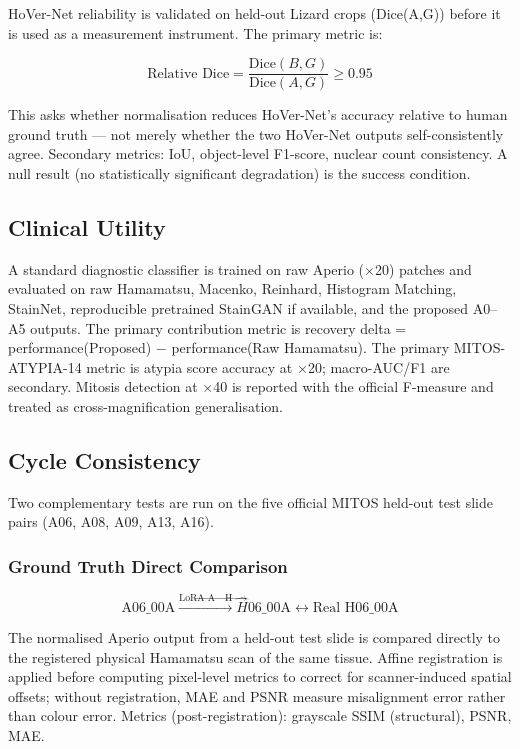 \documentclass[a4paper,twoside,12pt]{report}
\begin{document}
HoVer-Net reliability is validated on held-out Lizard crops (Dice(A,G)) before it is used as a measurement instrument. The primary metric is:

\begin{equation}
\text{Relative Dice} = \frac{\mathrm{Dice}(B, G)}{\mathrm{Dice}(A, G)} \geq 0.95
\end{equation}

This asks whether normalisation reduces HoVer-Net's accuracy relative to human ground truth --- not merely whether the two HoVer-Net outputs self-consistently agree. Secondary metrics: IoU, object-level F1-score, nuclear count consistency. A null result (no statistically significant degradation) is the success condition.

\subsection{Clinical Utility}

A standard diagnostic classifier is trained on raw Aperio ($\times$20) patches and evaluated on raw Hamamatsu, Macenko, Reinhard, Histogram Matching, StainNet, reproducible pretrained StainGAN if available, and the proposed A0--A5 outputs. The primary contribution metric is recovery delta = performance(Proposed) $-$ performance(Raw Hamamatsu). The primary MITOS-ATYPIA-14 metric is atypia score accuracy at $\times$20; macro-AUC/F1 are secondary. Mitosis detection at $\times$40 is reported with the official F-measure and treated as cross-magnification generalisation.

\subsection{Cycle Consistency}

Two complementary tests are run on the five official MITOS held-out test slide pairs (A06, A08, A09, A13, A16).

\subsubsection{Ground Truth Direct Comparison}

\begin{equation}
\text{A06\_00A} \xrightarrow{\text{LoRA A}\rightarrow\text{H}} \hat{H}\text{06\_00A} \longleftrightarrow \text{Real H06\_00A}
\end{equation}

The normalised Aperio output from a held-out test slide is compared directly to the registered physical Hamamatsu scan of the same tissue. Affine registration is applied before computing pixel-level metrics to correct for scanner-induced spatial offsets; without registration, MAE and PSNR measure misalignment error rather than colour error. Metrics (post-registration): grayscale SSIM (structural), PSNR, MAE.
\end{document}
